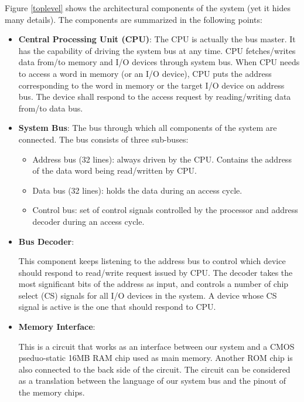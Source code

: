 \documentclass[oneside]{book}
\begin{document}
Figure \ref{toplevel} shows the architectural components of the system 
(yet it hides many details). The components are summarized in the 
following points:

\begin{itemize}

\item \textbf{Central Processing Unit (CPU)}:
The CPU is actually the bus master. It has the capability of
driving the system bus at any time. CPU fetches/writes data from/to 
memory and I/O devices through system bus. When CPU needs to access
a word in memory (or an I/O device), CPU puts the address corresponding
to the word in memory or the target I/O device on address bus. The device
shall respond to the access request by reading/writing data from/to data
bus.

\item \textbf{System Bus}:
The bus through which all components of the system are connected. The bus
consists of three sub-buses:

\begin{itemize}

\item Address bus (32 lines): always driven by the CPU. Contains the address
of the data word being read/written by CPU.

\item Data bus (32 lines): holds the data during an access cycle.

\item Control bus: set of control signals controlled by the processor and
address decoder during an access cycle.

\end{itemize}

\item \textbf{Bus Decoder}:

This component keeps listening to the address bus to control which device
should respond to read/write request issued by CPU. The decoder takes
the most significant bits of the address as input, and controls a number
of chip select (CS) signals for all I/O devices in the system. A device
whose CS signal is active is the one that should respond to CPU. 

\item \textbf{Memory Interface}:

This is a circuit that works as an interface between our system and a CMOS
pseduo-static 16MB RAM chip used as main memory. Another ROM chip is also
connected to the back side of the circuit. The circuit can be considered as
a translation between the language of our system bus and the pinout
of the memory chips.


\end{itemize}
\end{document}
